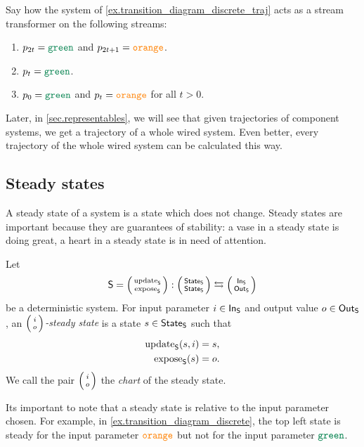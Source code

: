 \documentclass[DynamicalBook]{subfiles}
\begin{document}
\begin{exercise}
 Say how the system of \cref{ex.transition_diagram_discrete_traj} acts as a
 stream transformer on the following streams:
 \begin{enumerate}
   \item $p_{2t} = \Green$ and $p_{2t + 1} = {\color{orange} \mathtt{orange}}$.
   \item $p_t = \Green$.
   \item $p_0 = \Green$ and $p_t = {\color{orange} \mathtt{orange}}$ for
     all $t > 0$.
     \qedhere
 \end{enumerate}
\end{exercise}

Later, in \cref{sec.representables}, we will see that given trajectories of
component systems, we get a trajectory of a whole wired system. Even better,
every trajectory of the whole wired system can be calculated this way.


\subsection{Steady states}

A steady state of a system is a state which does not change. Steady states are
important because they are guarantees of stability: a vase in a steady state is doing great, a heart in a steady state is in need of attention.

\begin{definition}\label{def.steady_state_discrete}
 Let $$\Sys{S} = \lens{\update{S}}{\expose{S}} : \lens{\State{S}}{\State{S}}
 \leftrightarrows \lens{\In{S}}{\Out{S}}$$
 be a deterministic system. For input parameter $i \in \mathsf{In}_{\mathsf{S}}$ and output value
 $o \in \mathsf{Out}_{\mathsf{S}}$, an \emph{$\lens{i}{o}$-steady state} is a state $s \in \mathsf{State}_{\mathsf{S}}$
 such that
 \begin{align*}
   \mathrm{update}_{\mathsf{S}}(s, i) &= s, \\
   \mathrm{expose}_{\mathsf{S}}(s) &= o.
 \end{align*}
 We call the pair $\lens{i}{o}$ the \emph{chart} of the steady state.
\end{definition}

\begin{remark}
Its important to note that a steady state is relative to the input parameter
chosen. For example, in \cref{ex.transition_diagram_discrete}, the top left
state is steady for the input parameter ${\color{orange} \mathtt{orange}}$ but not for
the input parameter $\Green$.
\end{remark}
\end{document}
